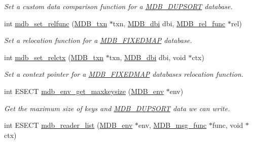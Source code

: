 \begin{DoxyCompactItemize}
\begin{DoxyCompactList}\small\item\em Set a custom data comparison function for a \mbox{\hyperlink{group__mdb__dbi__open_gae0626566c2562e9007f5c8c9535bab1a}{M\+D\+B\+\_\+\+D\+U\+P\+S\+O\+RT}} database. \end{DoxyCompactList}\item 
int \mbox{\hyperlink{group__internal_ga697d82c7afe79f142207ad5adcdebfeb}{mdb\+\_\+set\+\_\+relfunc}} (\mbox{\hyperlink{struct_m_d_b__txn}{M\+D\+B\+\_\+txn}} $\ast$txn, \mbox{\hyperlink{group__mdb_gadbe68a06c448dfb62da16443d251a78b}{M\+D\+B\+\_\+dbi}} dbi, \mbox{\hyperlink{group__mdb_ga311e8b7d73c5e7c03b625a894c5014cb}{M\+D\+B\+\_\+rel\+\_\+func}} $\ast$rel)
\begin{DoxyCompactList}\small\item\em Set a relocation function for a \mbox{\hyperlink{group__mdb__env_ga492952277c481bc4a6fa08ef71c29487}{M\+D\+B\+\_\+\+F\+I\+X\+E\+D\+M\+AP}} database. \end{DoxyCompactList}\item 
int \mbox{\hyperlink{group__internal_ga7c34246308cee01724a1839a8f5cc594}{mdb\+\_\+set\+\_\+relctx}} (\mbox{\hyperlink{struct_m_d_b__txn}{M\+D\+B\+\_\+txn}} $\ast$txn, \mbox{\hyperlink{group__mdb_gadbe68a06c448dfb62da16443d251a78b}{M\+D\+B\+\_\+dbi}} dbi, void $\ast$ctx)
\begin{DoxyCompactList}\small\item\em Set a context pointer for a \mbox{\hyperlink{group__mdb__env_ga492952277c481bc4a6fa08ef71c29487}{M\+D\+B\+\_\+\+F\+I\+X\+E\+D\+M\+AP}} database\textquotesingle{}s relocation function. \end{DoxyCompactList}\item 
int E\+S\+E\+CT \mbox{\hyperlink{group__internal_gad88d25c67bcf8299aa339b7bd74831a6}{mdb\+\_\+env\+\_\+get\+\_\+maxkeysize}} (\mbox{\hyperlink{struct_m_d_b__env}{M\+D\+B\+\_\+env}} $\ast$env)
\begin{DoxyCompactList}\small\item\em Get the maximum size of keys and \mbox{\hyperlink{group__mdb__dbi__open_gae0626566c2562e9007f5c8c9535bab1a}{M\+D\+B\+\_\+\+D\+U\+P\+S\+O\+RT}} data we can write. \end{DoxyCompactList}\item 
int E\+S\+E\+CT \mbox{\hyperlink{group__internal_gaef1fda1233efc53cd183db15480ad573}{mdb\+\_\+reader\+\_\+list}} (\mbox{\hyperlink{struct_m_d_b__env}{M\+D\+B\+\_\+env}} $\ast$env, \mbox{\hyperlink{group__mdb_ga02f6d37e96b28c8feed7e467f3414863}{M\+D\+B\+\_\+msg\+\_\+func}} $\ast$func, void $\ast$ctx)

\end{DoxyCompactItemize}
